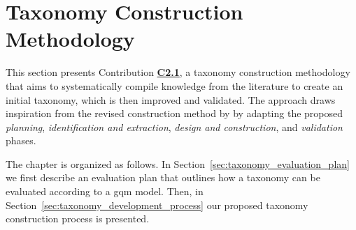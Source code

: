 

\chapter{Taxonomy Construction Methodology}
\label{ch:taxonomy_construction_approach}

This section presents Contribution \hyperref[enum:c2]{\textbf{C2.1}}, a taxonomy construction methodology that aims to systematically compile knowledge from the literature to create an initial taxonomy, which is then improved and validated. The approach draws inspiration from the revised construction method by \textcite{usman_taxonomies_2017} by adapting the proposed \emph{planning}, \emph{identification and extraction}, \emph{design and construction}, and \emph{validation} phases.

The chapter is organized as follows. In Section~\ref{sec:taxonomy_evaluation_plan} we first describe an evaluation plan that outlines how a taxonomy can be evaluated according to a \gls{gqm} model. Then, in Section~\ref{sec:taxonomy_development_process} our proposed taxonomy construction process is presented.




